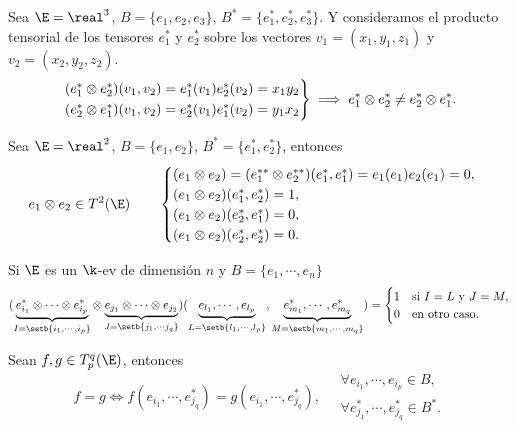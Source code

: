 \begin{example}
    Sea $\E = \real^3$, $B = \{e_1, e_2, e_3\}$, $B^* = \{ e_1^*, e_2^*, e_3^*\}$.
    Y consideramos el producto tensorial de los tensores $e_1^*$ y $e_2^*$ sobre
    los vectores $v_1 = (x_1, y_1, z_1)$ y $v_2 = (x_2,y_2,z_2)$.
    \[
        \begin{rcases}
            (e_1^* \otimes e_2^*)(v_1, v_2) = e_1^*(v_1)e_2^*(v_2) = x_1y_2 \\
            (e_2^* \otimes e_1^*)(v_1, v_2) = e_2^*(v_1)e_1^*(v_2) = y_1x_2
        \end{rcases}
        \implies e_1^* \otimes e_2^* \neq e_2^* \otimes e_1^*.
    \]
\end{example}
\begin{example}
    Sea $\E = \real^2$, $B = \{e_1, e_2\}$, $B^* = \{e_1^*, e_2^*\}$, entonces
    \[
        e_1 \otimes e_2 \in T^2(\E) \qquad \begin{cases}
            (e_1 \otimes e_2) = (e_1^{**} \otimes e_2^{**})(e_1^*,e_1^*) =
            e_1(e_1)e_2(e_1) = 0, \\
            (e_1 \otimes e_2)(e_1^*,e_2^*) = 1, \\
            (e_1 \otimes e_2)(e_2^*,e_1^*) = 0, \\
            (e_1 \otimes e_2)(e_2^*,e_2^*) = 0.
        \end{cases}
    \]
\end{example}
\begin{obs} \label{obs:tens_cero}
    Si $\E$ es un $\k$-ev de dimensión $n$ y $B = \{e_1, \cdots, e_n\}$
    \[
        (\underbrace{e_{i_1}^* \otimes \cdots \otimes e_{i_p}^*}_
        {I = \setb{i_1, \cdots, i_p}} \otimes
        \underbrace{e_{j_1} \otimes \cdots \otimes e_{j_2}}_
        {J = \setb{j_1, \cdots j_q}})(\underbrace{e_{l_1}, \cdots, e_{l_p}}_
        {L = \setb{l_1, \cdots, l_p}}, \underbrace{e_{m_1}^*, \cdots, e_{m_q}^*}_
        {M = \setb{m_1, \cdots, m_q}}) =
        \begin{cases}
            1 & \text{si } I = L \text{ y } J = M, \\
            0 & \text{en otro caso}.
        \end{cases}
    \]
\end{obs}
\begin{obs}
    Sean $f,g \in T_p^q(\E)$, entonces
    \[
        f=g \iff f(e_{i_1}, \cdots, e_{j_q}^*) = g(e_{i_1}, \cdots, e_{j_q}^*), \quad
        \begin{array}{l}
            \forall e_{i_1}, \cdots, e_{i_p} \in B, \\
            \forall e_{j_1}^*, \cdots,e_{j_q}^* \in B^*.
        \end{array}
    \]
\end{obs}

